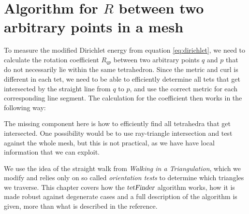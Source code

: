 \documentclass[../thesis.tex]{subfiles}
\begin{document}
\newcommand{\str}[1]{\textsc{#1}}
\newcommand{\var}[1]{\textit{#1}}


\chapter{Algorithm for $R$ between two arbitrary points in a mesh}
\label{ch:algorithm}
To measure the modified Dirichlet energy from equation \ref{eq:dirichlet}, we need to calculate the rotation coefficient $R_{qp}$
between two arbitrary points $q$ and $p$ that do not necessarily lie within the same 
tetrahedron. Since the metric and curl is different in each tet, we need to be
able to efficiently determine all tets that get intersected by the straight
line from $q$ to $p$, and use the correct metric for each corresponding
line segment.
The calculation for the coefficient then works in the following way:

The missing component here is how to efficiently find all tetrahedra
that get intersected. One possibility would be to use ray-triangle intersection and
test against the whole mesh, but this is not practical, as we have have local information
that we can exploit.

We use the idea of the straight walk from \emph{Walking in a Triangulation}\cite{Devillers}, which we modify and relies only on
so called \emph{orientation tests} to determine which triangles we traverse.
This chapter covers how the $\textsl{tetFinder}$ algorithm works, how it is made robust
against degenerate cases
and a full description of the algorithm is given, more than what is described in the reference.
\end{document}
